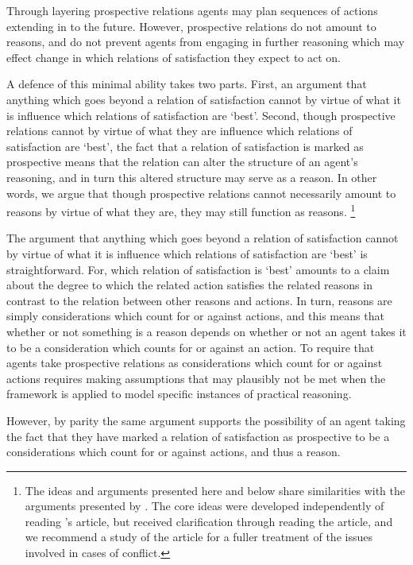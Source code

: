\documentclass[10pt]{article}
\makeatletter
\renewcommand\paragraph{\@startsection{paragraph}{5}{\z@}%
  {3.25ex \@plus1ex \@minus.2ex}%
  {-1em}%
  {\normalfont\normalsize\bfseries}}
\makeatother
\begin{document}
Through layering prospective relations agents may plan sequences of actions extending in to the future.
However, prospective relations do not amount to reasons, and do not prevent agents from engaging in further reasoning which may effect change in which relations of satisfaction they expect to act on.

A defence of this minimal ability takes two parts.
First, an argument that anything which goes beyond a relation of satisfaction cannot by virtue of what it is influence which relations of satisfaction are `best'.
Second, though prospective relations cannot by virtue of what they are influence which relations of satisfaction are `best', the fact that a relation of satisfaction is marked as prospective means that the relation can alter the structure of an agent's reasoning, and in turn this altered structure may serve as a reason.
In other words, we argue that though prospective relations cannot necessarily amount to reasons by virtue of what they are, they may still function as reasons.\nolinebreak
\footnote{The ideas and arguments presented here and below share similarities with the arguments presented by \textcite{Broome:2001aa}.
The core ideas were developed independently of reading \citeauthor{Broome:2001aa}'s article, but received clarification through reading the article, and we recommend a study of the article for a fuller treatment of the issues involved in cases of conflict.}

The argument that anything which goes beyond a relation of satisfaction cannot by virtue of what it is influence which relations of satisfaction are `best' is straightforward.
For, which relation of satisfaction is `best' amounts to a claim about the degree to which the related action satisfies the related reasons in contrast to the relation between other reasons and actions.
In turn, reasons are simply considerations which count for or against actions, and this means that whether or not something is a reason depends on whether or not an agent takes it to be a consideration which counts for or against an action.
To require that agents take prospective relations as considerations which count for or against actions requires making assumptions that may plausibly not be met when the framework is applied to model specific instances of practical reasoning.

However, by parity the same argument supports the possibility of an agent taking the fact that they have marked a relation of satisfaction as prospective to be a considerations which count for or against actions, and thus a reason.
\end{document}
